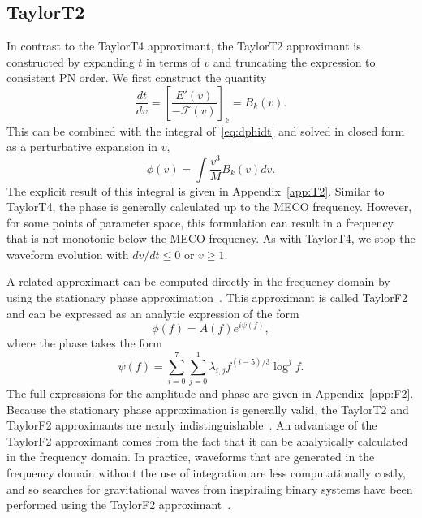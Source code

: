 
\subsection{TaylorT2}
\label{subsec:t2}

In contrast to the TaylorT4 approximant, the TaylorT2 approximant is
constructed by expanding $t$ in terms of $v$ and truncating the expression to
consistent \ac{PN} order. We first construct the quantity
%
\begin{equation}\label{eq:t2}
%
\frac{dt}{dv} = \left[ \frac{E'(v)}{-\mathcal{F}(v)} \right]_{k} = B_{k}(v).
%
\end{equation}
%
This can be combined with the integral of~\eqref{eq:dphidt} and solved in
closed form as a perturbative expansion in $v$,
%
\begin{equation}\label{eq:phaset2}
%
\phi(v) = \int \frac{v^3}{M} B_{k}(v) dv.
%
\end{equation}
%
The explicit result of this integral is given in Appendix~\ref{app:T2}.
Similar to TaylorT4, the phase is generally calculated up to the \ac{MECO}
frequency. However, for some points of parameter space, this formulation can
result in a frequency that is not monotonic below the \ac{MECO} frequency.
As with TaylorT4, we stop the waveform evolution with $dv/dt \leq 0$ or $v \geq 1$.


A related approximant can be computed directly in the frequency domain by using
the stationary phase approximation~\cite{Droz:1999qx,Blanchet:2006zz}.  This
approximant is called TaylorF2 and can be expressed as an analytic expression
of the form
%
\begin{equation}
%
\phi(f) = A(f) e^{ i \psi(f) },
%
\end{equation}
%
where the phase takes the form
%
\begin{equation}
%
\psi(f) = \sum_{i = 0}^{7} \sum_{j = 0}^{1} \lambda_{i, j} f^{(i-5)/3} \log^j
f.
%
\end{equation}
%
The full expressions for the amplitude and phase are given in
Appendix~\ref{app:F2}.  Because the stationary phase approximation is generally
valid, the TaylorT2 and TaylorF2 approximants are nearly
indistinguishable~\cite{Droz:1999qx}. An advantage of the TaylorF2 approximant
comes from the fact that it can be analytically calculated in the frequency
domain.  In practice, waveforms that are generated in the frequency domain
without the use of integration are less computationally costly, and so searches
for  gravitational waves from inspiraling binary systems have been performed using the
TaylorF2 approximant~\cite{Blanchet:1996pi, Droz:1999qx, Blanchet:2006zz,
Abbott:2003pj, Abbott:2005pf, Abbott:2005pe, Abbott:2005qm, Abbott:2007xi,
Abbott:2009zi, Abbott:2009qj, Abadie:2010yba, Abadie:2011nz, Abbott:2007rh,
Abadie:2010uf, Briggs:2012ce}.


